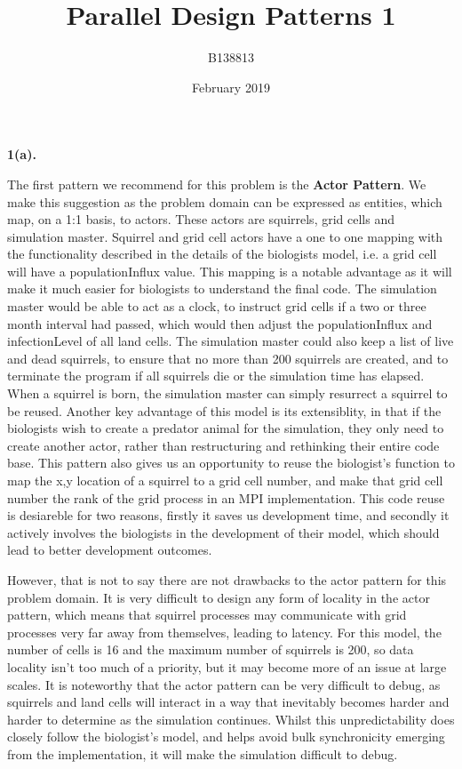 \documentclass{article}
\title{Parallel Design Patterns 1}
\author{B138813}
\date{February 2019}
\begin{document}
\noindent\textbf{1(a).} \newline

The first pattern we recommend for this problem is the \textbf{Actor Pattern}. We make this suggestion as the problem domain can be expressed as entities, which map, on a 1:1 basis, to actors. These actors are squirrels, grid cells and simulation master. Squirrel and grid cell actors have a one to one mapping with the functionality described in the details of the biologists model, i.e. a grid cell will have a populationInflux value. This mapping is a notable advantage as it will make it much easier for biologists to understand the final code. The simulation master would be able to act as a clock, to instruct grid cells if a two or three month interval had passed, which would then adjust the populationInflux and infectionLevel of all land cells. The simulation master could also keep a list of live and dead squirrels, to ensure that no more than 200 squirrels are created, and to terminate the program if all squirrels die or the simulation time has elapsed. When a squirrel is born, the simulation master can simply resurrect a squirrel to be reused. Another key advantage of this model is its extensiblity, in that if the biologists wish to create a predator animal for the simulation, they only need to create another actor, rather than restructuring and rethinking their entire code base. This pattern also gives us an opportunity to reuse the biologist's function to map the x,y location of a squirrel to a grid cell number, and make that grid cell number the rank of the grid process in an MPI implementation. This code reuse is desiareble for two reasons, firstly it saves us development time, and secondly it actively involves the biologists in the development of their model, which should lead to better development outcomes.

However, that is not to say there are not drawbacks to the actor pattern for this problem domain. It is very difficult to design any form of locality in the actor pattern, which means that squirrel processes may communicate with grid processes very far away from themselves, leading to latency. For this model, the number of cells is 16 and the maximum number of squirrels is 200, so data locality isn't too much of a priority, but it may become more of an issue at large scales. It is noteworthy that the actor pattern can be very difficult to debug, as squirrels and land cells will interact in a way that inevitably becomes harder and harder to determine as the simulation continues. Whilst this unpredictability does closely follow the biologist's model, and helps avoid bulk synchronicity emerging from  the implementation, it will make the simulation difficult to debug.
\end{document}
